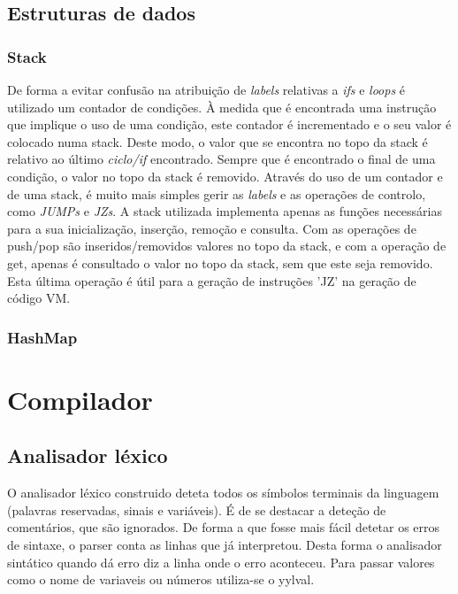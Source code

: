 \documentclass[a4paper,10pt]{report}
\begin{document}
\section{Estruturas de dados}

\subsection{Stack}
      De forma a evitar confusão na atribuição de \emph{labels} relativas a \emph{ifs} e \emph{loops} é utilizado um contador de condições. À medida que é encontrada uma instrução que implique o uso de uma condição, este contador é incrementado e o seu valor é colocado numa stack. Deste modo, o valor que se encontra no topo da stack é relativo ao último \emph{ciclo/if} encontrado. Sempre que é encontrado o final de uma condição, o valor no topo da stack é removido. Através do uso de um contador e de uma stack, é muito mais simples gerir as \emph{labels} e as operações de controlo, como \emph{JUMPs} e \emph{JZs}.
      A stack utilizada implementa apenas as funções necessárias para a sua inicialização, inserção, remoção e consulta. Com as operações de push/pop são inseridos/removidos valores no topo da stack, e com a operação de get, apenas é consultado o valor no topo da stack, sem que este seja removido. Esta última operação é útil para a geração de instruções 'JZ' na geração de código VM.

\subsection{HashMap}
	


\chapter{Compilador}


\section{Analisador léxico}
  O analisador léxico construido deteta todos os símbolos terminais da linguagem (palavras reservadas, sinais e variáveis).
  É de se destacar a deteção de comentários, que são ignorados.
  De forma a que fosse mais fácil detetar os erros de sintaxe, o parser conta as linhas que já interpretou. Desta forma o analisador sintático quando dá erro diz a linha onde o erro aconteceu.  
  Para passar valores como o nome de variaveis ou números utiliza-se o yylval.
\end{document}
